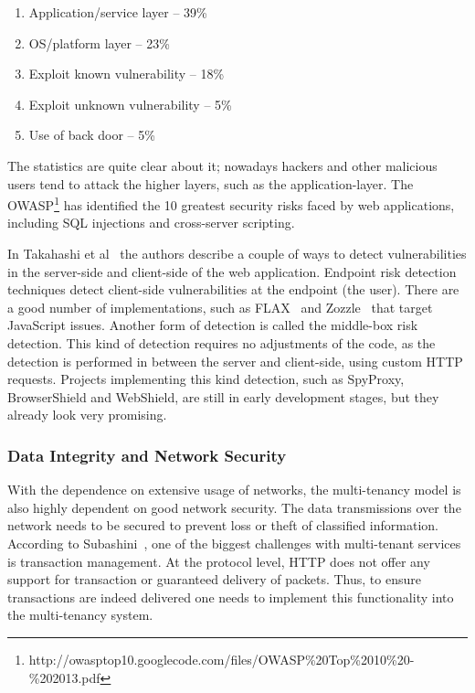 \begin{enumerate}
    \item Application/service layer – 39\%
    \item OS/platform layer – 23\%
    \item Exploit known vulnerability – 18\%
    \item Exploit unknown vulnerability – 5\%
    \item Use of back door – 5\%
\end{enumerate}

The statistics are quite clear about it; nowadays hackers and other malicious users tend to attack the higher layers, such as the application-layer. 
The \ac{OWASP}\footnote{http://owasptop10.googlecode.com/files/OWASP\%20Top\%2010\%20-\%202013.pdf} has identified the 10 greatest security risks faced by web applications, including SQL injections and cross-server scripting.

In Takahashi et al~\cite{Takahashi2012Security} the authors describe a couple of ways to detect vulnerabilities in the server-side and client-side of the web application. 
Endpoint risk detection techniques detect client-side vulnerabilities at the endpoint (the user). 
There are a good number of implementations, such as FLAX~\cite{saxena10kudzu} and Zozzle~\cite{curtsinger2011zozzle} that target JavaScript issues. 
Another form of detection is called the middle-box risk detection. 
This kind of detection requires no adjustments of the code, as the detection is performed in between the server and client-side, using custom HTTP requests. 
Projects implementing this kind detection, such as SpyProxy, BrowserShield and WebShield, are still in early development stages, but they already look very promising.

\subsubsection{Data Integrity and Network Security}
With the dependence on extensive usage of networks, the multi-tenancy model is also highly dependent on good network security.  
The data transmissions over the network needs to be secured to prevent loss or theft of classified information. 
According to Subashini~\cite{Subashini2011Security}, one of the biggest challenges with multi-tenant services is transaction management. 
At the protocol level, HTTP does not offer any support for transaction or guaranteed delivery of packets. 
Thus, to ensure transactions are indeed delivered one needs to implement this functionality into the multi-tenancy system.

